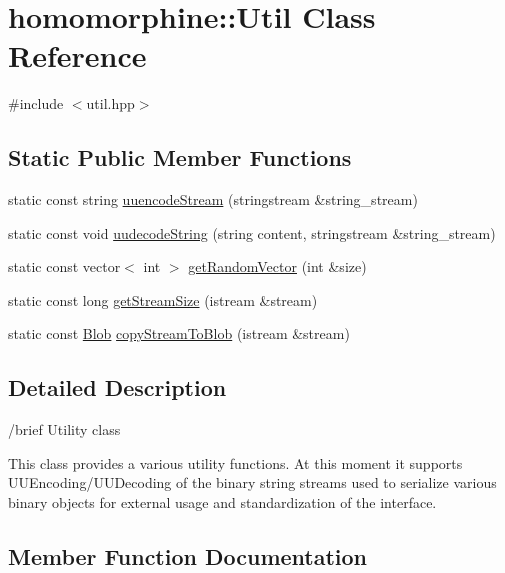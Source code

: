 \hypertarget{classhomomorphine_1_1_util}{}\section{homomorphine\+::Util Class Reference}
\label{classhomomorphine_1_1_util}


{\ttfamily \#include $<$util.\+hpp$>$}

\subsection*{Static Public Member Functions}
\begin{DoxyCompactItemize}
\item 
static const string \mbox{\hyperlink{classhomomorphine_1_1_util_a26f29995aa48f4374993ec4afeca2ac8}{uuencode\+Stream}} (stringstream \&string\+\_\+stream)
\item 
static const void \mbox{\hyperlink{classhomomorphine_1_1_util_aba5af6d7356aca8c70ae4fb1e5d36b70}{uudecode\+String}} (string content, stringstream \&string\+\_\+stream)
\item 
static const vector$<$ int $>$ \mbox{\hyperlink{classhomomorphine_1_1_util_a2dcf1d83028f3d47ba49b80696fefef7}{get\+Random\+Vector}} (int \&size)
\item 
static const long \mbox{\hyperlink{classhomomorphine_1_1_util_acf2321afce14e9c20ca572159592e0e2}{get\+Stream\+Size}} (istream \&stream)
\item 
static const \mbox{\hyperlink{structblob__t}{Blob}} \mbox{\hyperlink{classhomomorphine_1_1_util_ac5eb36f574baba0655e022cbca4b3b58}{copy\+Stream\+To\+Blob}} (istream \&stream)
\end{DoxyCompactItemize}


\subsection{Detailed Description}
/brief Utility class

This class provides a various utility functions. At this moment it supports U\+U\+Encoding/\+U\+U\+Decoding of the binary string streams used to serialize various binary objects for external usage and standardization of the interface. 

\subsection{Member Function Documentation}
\mbox{\label{classhomomorphine_1_1_util_ac5eb36f574baba0655e022cbca4b3b58}} 
